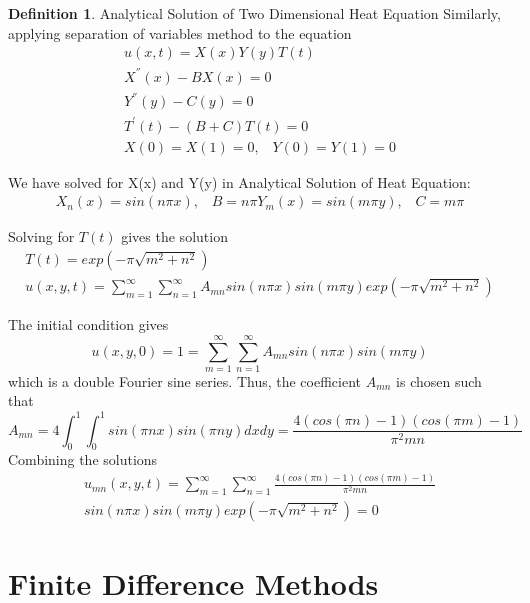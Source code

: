 \documentclass[12pt, oneside]{book}
\theoremstyle{plain}
\theoremstyle{definition}
\newtheorem{definition}[theorem]{Definition}
\begin{document}
\begin{definition}\label{heat2Anal} Analytical Solution of Two Dimensional Heat Equation
Similarly, applying separation of variables method to the equation
\begin{eqnarray}
u(x,t) = X(x) Y(y) T(t) \\[10pt]
X^{''}(x) - B X(x) = 0 \\[10pt]
Y^{''}(y) - C (y) = 0 \\[10pt]
T^{'}(t) - (B + C) T(t) = 0 \\[10pt]
X(0) = X(1) = 0, \hspace{10pt} Y(0) = Y(1) = 0
\end{eqnarray}

We have solved for X(x) and Y(y) in Analytical Solution of Heat Equation:
\begin{eqnarray} 
X_n (x)=  sin(n \pi x), \hspace{10pt} B = n \pi
Y_m (x)=  sin(m \pi y), \hspace{10pt} C = m \pi
\end{eqnarray}

Solving for $T(t)$ gives the solution
\begin{eqnarray}
T(t) = exp(- \pi \sqrt{m^2 + n^2}) \\[10pt]
u(x, y, t) =\sum_{m=1}^{\infty} \sum_{n=1}^{\infty} A_{mn}  sin(n \pi x) sin(m \pi y) exp(- \pi \sqrt{m^2 + n^2})
\end{eqnarray}

The initial condition gives
\begin{equation}
u(x, y, 0) = 1 = \sum_{m=1}^{\infty} \sum_{n=1}^{\infty}  A_{mn} sin(n \pi x) sin(m \pi y)
\end{equation}
which is a double Fourier sine series. Thus, the coefficient $A_{mn}$ is chosen such that
\begin{equation}
 A_{mn} = 4 \int_{0}^{1}  \int_{0}^{1} sin(\pi n x)  sin(\pi n y) dx dy = \frac{4(cos(\pi n) - 1)(cos(\pi m) - 1)}{\pi^2 m n} 
\end{equation}
Combining the solutions
\begin{multline}
u_{mn}(x, y, t) =  \sum_{m=1}^{\infty} \sum_{n=1}^{\infty} \frac{4(cos(\pi n) - 1)(cos(\pi m) - 1)}{\pi^2 m n}  \\ sin(n \pi x) sin(m \pi y) exp(- \pi \sqrt{m^2 + n^2}) = 0
\end{multline}

\end{definition}

\section{Finite Difference Methods}
\end{document}
